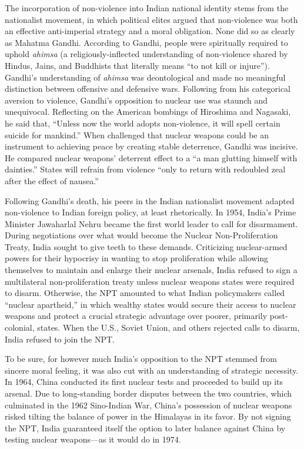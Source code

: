\documentclass[12pt]{article}
\begin{document}
The incorporation of non-violence into Indian national identity stems from the nationalist movement, in which political elites argued that non-violence was both an effective anti-imperial strategy and a moral obligation. None did so as clearly as Mahatma Gandhi. According to Gandhi, people were spiritually required to uphold \textit{ahimsa} (a religiously-inflected understanding of non-violence shared by Hindus, Jains, and Buddhists that literally means “to not kill or injure”). Gandhi's understanding of \textit{ahimsa} was deontological and made no meaningful distinction between offensive and defensive wars. Following from his categorical aversion to violence, Gandhi's opposition to nuclear use was staunch and unequivocal. Reflecting on the American bombings of Hiroshima and Nagasaki, he said that, “Unless now the world adopts non-violence, it will spell certain suicide for mankind.” When challenged that nuclear weapons could be an instrument to achieving peace by creating stable deterrence, Gandhi was incisive. He compared nuclear weapons' deterrent effect to a “a man glutting himself with dainties.” States will refrain from violence “only to return with redoubled zeal after the effect of nausea.”

Following Gandhi's death, his peers in the Indian nationalist movement adapted non-violence to Indian foreign policy, at least rhetorically. In 1954, India's Prime Minister Jawaharlal Nehru became the first world leader to call for disarmament. During negotiations over what would become the Nuclear Non-Proliferation Treaty, India sought to give teeth to these demands. Criticizing nuclear-armed powers for their hypocrisy in wanting to stop proliferation while allowing themselves to maintain and enlarge their nuclear arsenals, India refused to sign a multilateral non-proliferation treaty unless nuclear weapons states were required to disarm. Otherwise, the NPT amounted to what Indian policymakers called “nuclear apartheid,” in which wealthy states would secure their access to nuclear weapons and protect a crucial strategic advantage over poorer, primarily post-colonial, states. When the U.S., Soviet Union, and others rejected calls to disarm, India refused to join the NPT.

To be sure, for however much India's opposition to the NPT stemmed from sincere moral feeling, it was also cut with an understanding of strategic necessity. In 1964, China conducted its first nuclear tests and proceeded to build up its arsenal. Due to long-standing border disputes between the two countries, which culminated in the 1962 Sino-Indian War, China's possession of nuclear weapons risked tilting the balance of power in the Himalayas in its favor. By not signing the NPT, India guaranteed itself the option to later balance against China by testing nuclear weapons—as it would do in 1974. 
\end{document}
